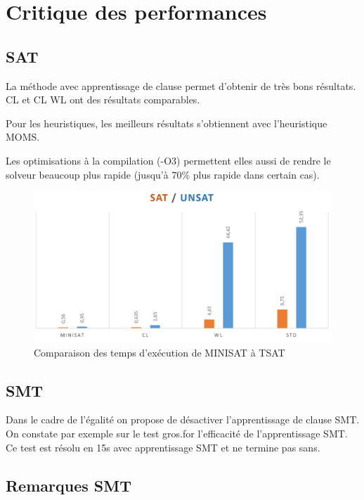 \documentclass{article}
\begin{document}
\section{Critique des performances}
\subsection{SAT}
La méthode avec apprentissage de clause permet d'obtenir de très bons résultats. CL et CL WL ont des résultats comparables.

Pour les heuristiques, les meilleurs résultats s'obtiennent avec l'heuristique MOMS.

Les optimisations à la compilation (-O3) permettent elles aussi de rendre le solveur beaucoup plus rapide (jusqu'à 70\% plus rapide dans certain cas).
\\
\begin{figure}[h]
    \begin{center}
        \includegraphics[scale=0.25]{time.png}
    \end{center}
    \caption{Comparaison des temps d'exécution de MINISAT à TSAT}
    \label{Comparaisons}
\end{figure}

\subsection{SMT}
Dans le cadre de l'égalité on propose de désactiver l'apprentissage de clause SMT. On constate par exemple sur le test gros.for l'efficacité de l'apprentissage SMT. Ce test est résolu en 15s avec apprentissage SMT et ne termine pas sans.

\subsection{Remarques SMT}
\end{document}
